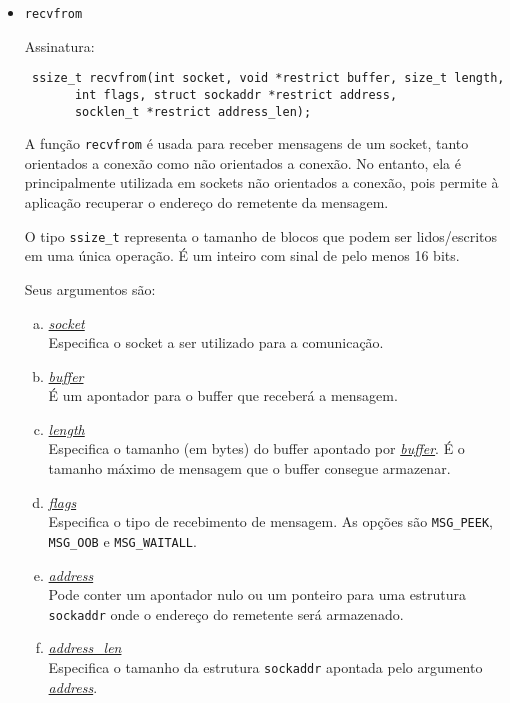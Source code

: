 \documentclass[a4paper,10pt]{article}
\begin{document}
\begin{itemize}
\item {\tt recvfrom}

Assinatura:
\begin{lstlisting}
 ssize_t recvfrom(int socket, void *restrict buffer, size_t length,
       int flags, struct sockaddr *restrict address,
       socklen_t *restrict address_len);
\end{lstlisting}

A função {\tt recvfrom} é usada para receber mensagens de um socket, tanto orientados a conexão como não orientados a conexão. No entanto, ela é principalmente utilizada em sockets não orientados a conexão, pois permite à aplicação recuperar o endereço do remetente da mensagem.

O tipo {\tt ssize\_t} representa o tamanho de blocos que podem ser lidos/escritos em uma única operação. É um inteiro com sinal de pelo menos 16 bits.

Seus argumentos são:
\begin{enumerate}[a)]
\item \textit{\underline{socket}}\\
Especifica o socket a ser utilizado para a comunicação.

\item \textit{\underline{buffer}}\\
É um apontador para o buffer que receberá a mensagem.

\item \textit{\underline{length}}\\
Especifica o tamanho (em bytes) do buffer apontado por \textit{\underline{buffer}}. É o tamanho máximo de mensagem que o buffer consegue armazenar.

\item \textit{\underline{flags}}\\
Especifica o tipo de recebimento de mensagem. As opções são {\tt MSG\_PEEK}, {\tt MSG\_OOB} e {\tt MSG\_WAITALL}.

\item \textit{\underline{address}}\\
Pode conter um apontador nulo ou um ponteiro para uma estrutura {\tt sockaddr} onde o endereço do remetente será armazenado.

\item \textit{\underline{address\_len}}\\
Especifica o tamanho da estrutura {\tt sockaddr} apontada pelo argumento \textit{\underline{address}}.
\end{enumerate}


\end{itemize}
\end{document}
